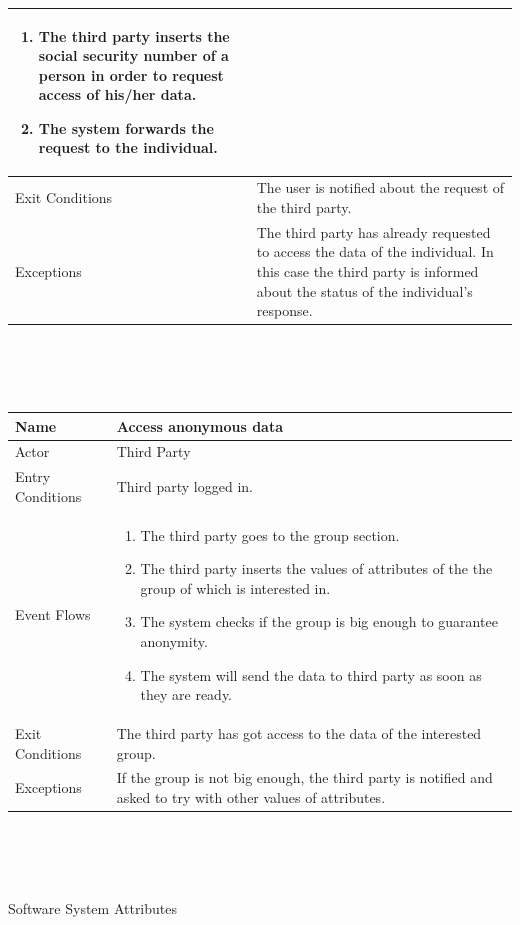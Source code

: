 \documentclass{article}
\begin{document}
\begin{legal}
\begin{legal}
\begin{legal}
\begin{tabular}{| m{3.5cm} | m{8cm}| }
\begin{enumerate}
									\item The third party inserts the social security number of a person in order to request access of his/her data.
									\item The system forwards the request to the individual.
				\end{enumerate}\\
				\hline
					Exit Conditions & The user is notified about the request of the third party.\\
				\hline
					Exceptions & The third party has already requested to access the data of the individual. In this case the third party is informed about the status of the individual's response.\\
				\hline
				\end{tabular}
				\\\\\\
				\begin{tabular}{| m{3.5cm} | m{8cm}| }
				\hline
					Name & Access anonymous data\\
				\hline
					Actor & Third Party\\
				\hline
					Entry Conditions & Third party logged in.\\
				\hline
					Event Flows & \begin{enumerate}
									\item The third party goes to the group section.
									\item The third party inserts the values of attributes of the the group of which is interested in.
									\item The system checks if the group is big enough to guarantee anonymity.
									\item The system will send the data to third party as soon as they are ready.
				\end{enumerate}\\
				\hline
					Exit Conditions & The third party has got access to the data of the interested group.\\
				\hline
					Exceptions & If the group is not big enough, the third party is notified and asked to try with other values of attributes.\\
				\hline
				\end{tabular}
				\\\\\\
    		\end{legal}
    		\item Software System Attributes \\

\end{legal}
\end{legal}
\end{document}
